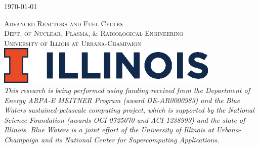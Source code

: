 \begin{titlepage}
    \vspace{0.5cm} %
    {\large \today} %
    \vspace{0.5cm}


    \textsc{\LARGE Advanced Reactors and Fuel Cycles}\\[0.25cm] %

    \textsc{\large Dept. of Nuclear, Plasma, \& Radiological Engineering}\\%

    \textsc{\large University of Illiois at Urbana-Champaign}\\ %




    \vspace{0.5cm}
    \includegraphics[width=0.8\textwidth]{./illinois.eps}\\[1cm] %


    \newpage
    \textit{This research is being performed using funding received
    from the
    Department of Energy ARPA-E MEITNER Program (award DE-AR0000983)
    and the
    Blue Waters sustained-petascale computing project, which is
    supported by
    the National Science Foundation (awards OCI-0725070 and
    ACI-1238993) and
    the state of Illinois. Blue Waters is a joint effort of the
    University of
    Illinois at Urbana-Champaign and its National Center for
    Supercomputing
    Applications.}

\end{titlepage}
\pagebreak






